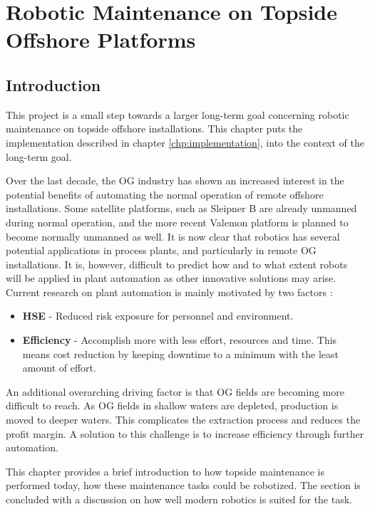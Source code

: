 \chapter{Robotic Maintenance on Topside Offshore Platforms}
\label{chp:maintenance}

\section{Introduction}

This project is a small step towards a larger long-term goal concerning robotic maintenance on topside offshore installations. This chapter puts the implementation described in chapter \ref{chp:implementation}, into the context of the long-term goal. 

Over the last decade, the \ac{OG} industry has shown an increased interest in the potential benefits of automating the normal operation of remote offshore installations. Some satellite platforms, such as Sleipner B are already unmanned during normal operation, and the more recent Valemon platform is planned to become normally unmanned as well. It is now clear that robotics has several potential applications in process plants, and particularly in remote \ac{OG} installations. It is, however, difficult to predict how and to what extent robots will be applied in plant automation as other innovative solutions may arise\cite{statoil_ubemannet}\cite{subsea_konkurranse}\cite{E24}. Current research on plant automation is mainly motivated by two factors\cite{AutonomousOG} \cite{StepwiseApproachToRobotics}:

\begin{itemize}
	\item \textbf{HSE} - Reduced risk exposure for personnel and environment. 
	\item \textbf{Efficiency} - Accomplish more with less effort, resources and time. This means cost reduction by keeping downtime to a minimum with the least amount of effort.
\end{itemize} 

An additional overarching driving factor is that \ac{OG} fields are becoming more difficult to reach. As \ac{OG} fields in shallow waters are depleted, production is moved to deeper waters. This complicates the extraction process and reduces the profit margin. A solution to this challenge is to increase efficiency through further automation. 

This chapter provides a brief introduction to how topside maintenance is performed today, how these maintenance tasks could be robotized. The section is concluded with a discussion on how well modern robotics is suited for the task. 

